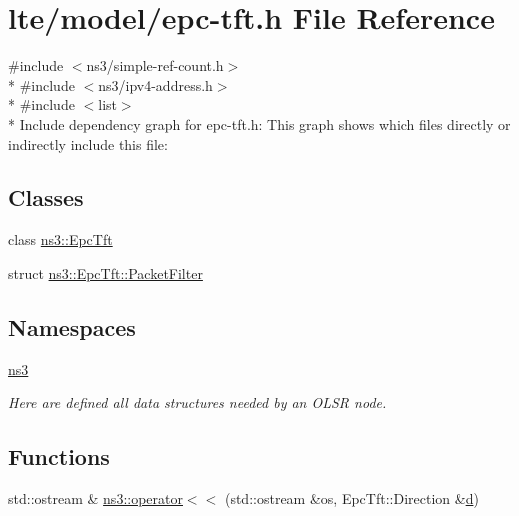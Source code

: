 \hypertarget{epc-tft_8h}{}\section{lte/model/epc-\/tft.h File Reference}
\label{epc-tft_8h}
{\ttfamily \#include $<$ns3/simple-\/ref-\/count.\+h$>$}\\*
{\ttfamily \#include $<$ns3/ipv4-\/address.\+h$>$}\\*
{\ttfamily \#include $<$list$>$}\\*
Include dependency graph for epc-\/tft.h\+:
This graph shows which files directly or indirectly include this file\+:
\subsection*{Classes}
\begin{DoxyCompactItemize}
\item 
class \hyperlink{classns3_1_1EpcTft}{ns3\+::\+Epc\+Tft}
\item 
struct \hyperlink{structns3_1_1EpcTft_1_1PacketFilter}{ns3\+::\+Epc\+Tft\+::\+Packet\+Filter}
\end{DoxyCompactItemize}
\subsection*{Namespaces}
\begin{DoxyCompactItemize}
\item 
 \hyperlink{namespacens3}{ns3}
\begin{DoxyCompactList}\small\item\em Here are defined all data structures needed by an O\+L\+SR node. \end{DoxyCompactList}\end{DoxyCompactItemize}
\subsection*{Functions}
\begin{DoxyCompactItemize}
\item 
std\+::ostream \& \hyperlink{namespacens3_a21ba8e0e3652e137b3e9008fdb92090d}{ns3\+::operator$<$$<$} (std\+::ostream \&os, Epc\+Tft\+::\+Direction \&\hyperlink{lte__pathloss_8m_a1aabac6d068eef6a7bad3fdf50a05cc8}{d})
\end{DoxyCompactItemize}
